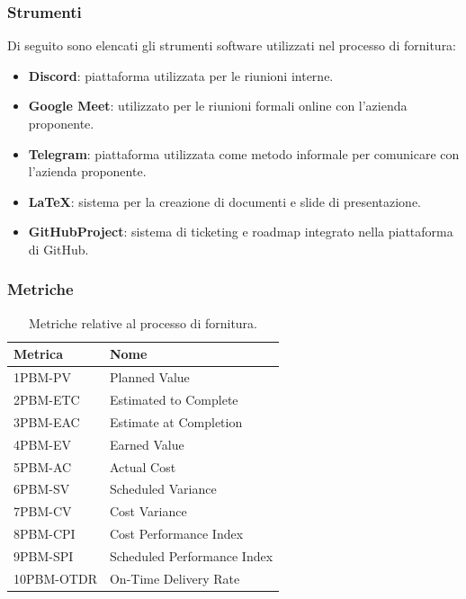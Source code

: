 \subsubsection{Strumenti}
Di seguito sono elencati gli strumenti software utilizzati nel processo di fornitura:
\begin{itemize}
    \item \textbf{Discord}: piattaforma utilizzata per le riunioni interne.
    \item \textbf{Google Meet}: utilizzato per le riunioni formali online con l'azienda proponente.
    \item \textbf{Telegram}: piattaforma utilizzata come metodo informale per comunicare con l'azienda proponente.
    \item \textbf{LaTeX}: sistema per la creazione di documenti e slide di presentazione.
    \item \textbf{GitHubProject}: sistema di ticketing e roadmap integrato nella piattaforma di GitHub. 
\end{itemize}

\subsubsection{Metriche}
\begin{table}[h!]
    \centering
    \renewcommand{\arraystretch}{1.5}
    \begin{tabular}{|m{5cm}|m{5cm}|}
        \hline
        \textbf{Metrica} & \textbf{Nome} \\ \hline
        1PBM-PV         & Planned Value \\ \hline
        2PBM-ETC        & Estimated to Complete \\ \hline
        3PBM-EAC        & Estimate at Completion \\ \hline
        4PBM-EV         & Earned Value \\ \hline
        5PBM-AC         & Actual Cost \\ \hline
        6PBM-SV         & Scheduled Variance \\ \hline
        7PBM-CV         & Cost Variance \\ \hline
        8PBM-CPI        & Cost Performance Index \\ \hline
        9PBM-SPI        & Scheduled Performance Index \\ \hline
        10PBM-OTDR      & On-Time Delivery Rate \\ \hline
    \end{tabular}
    \caption{Metriche relative al processo di fornitura.}
    \label{tab:metriche}
\end{table}







